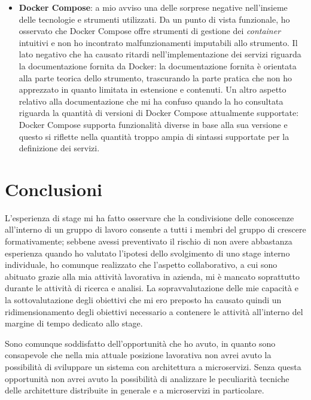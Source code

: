\begin{itemize}
  \item \textbf{Docker Compose}: a mio avviso una delle sorprese negative nell'insieme delle tecnologie e strumenti utilizzati. Da un punto di vista funzionale, ho osservato che Docker Compose offre strumenti di gestione dei \emph{container} intuitivi e non ho incontrato malfunzionamenti imputabili allo strumento. Il lato negativo che ha causato ritardi nell'implementazione dei servizi riguarda la documentazione fornita da Docker: la documentazione fornita è orientata alla parte teorica dello strumento, trascurando la parte pratica che non ho apprezzato in quanto limitata in estensione e contenuti. Un altro aspetto relativo alla documentazione che mi ha confuso quando la ho consultata riguarda la quantità di versioni di Docker Compose attualmente supportate: Docker Compose supporta funzionalità diverse in base alla sua versione e questo si riflette nella quantità troppo ampia di sintassi supportate per la definizione dei servizi.
\end{itemize}



\section{Conclusioni}

L'esperienza di stage mi ha fatto osservare che la condivisione delle conoscenze all'interno di un gruppo di lavoro consente a tutti i membri del gruppo di crescere formativamente; sebbene avessi preventivato il rischio di non avere abbastanza esperienza quando ho valutato l'ipotesi dello svolgimento di uno stage interno individuale, ho comunque realizzato che l'aspetto collaborativo, a cui sono abituato grazie alla mia attività lavorativa in azienda, mi è mancato soprattutto durante le attività di ricerca e analisi. La sopravvalutazione delle mie capacità e la sottovalutazione degli obiettivi che mi ero preposto ha causato quindi un ridimensionamento degli obiettivi necessario a contenere le attività all'interno del margine di tempo dedicato allo stage.

Sono comunque soddisfatto dell'opportunità che ho avuto, in quanto sono consapevole che nella mia attuale posizione lavorativa non avrei avuto la possibilità di sviluppare un sistema con architettura a microservizi. Senza questa opportunità non avrei avuto la possibilità di analizzare le peculiarità tecniche delle architetture distribuite in generale e a microservizi in particolare.  